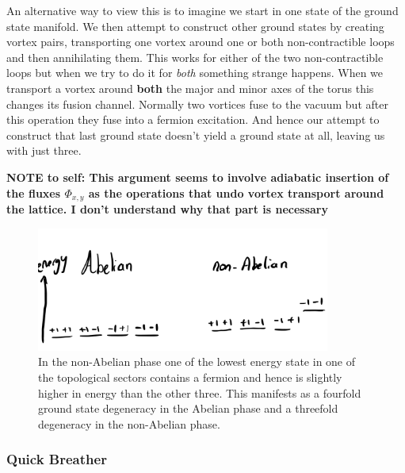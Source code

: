 An alternative way to view this is to imagine we start in one state of the ground state manifold. We then attempt to construct other ground states by creating vortex pairs, transporting one vortex around one or both non-contractible loops and then annihilating them. This works for either of the two non-contractible loops but when we try to do it for \emph{both} something strange happens. When we transport a vortex around \textbf{both} the major and minor axes of the torus this changes its fusion channel. Normally two vortices fuse to the vacuum but after this operation they fuse into a fermion excitation. And hence our attempt to construct that last ground state doesn't yield a ground state at all, leaving us with just three.

\textbf{NOTE to self: This argument seems to involve adiabatic insertion of the fluxes \(\Phi_{x,y}\) as the operations that undo vortex transport around the lattice. I don't understand why that part is necessary}

\begin{figure}
\hypertarget{fig:threefold_degeneracy}{%
\centering
\includegraphics[width=0.86\textwidth,height=\textheight]{figure_code/amk_chapter/threefold_degeneracy.png}
\caption[Ground State Degeneracy in the Abelian and Non-Abelian Phases]{In the non-Abelian phase one of the lowest energy state in one
of the topological sectors contains a fermion and hence is slightly
higher in energy than the other three. This manifests as a fourfold
ground state degeneracy in the Abelian phase and a threefold degeneracy
in the non-Abelian phase.}\label{fig:threefold_degeneracy}
}
\end{figure}

\hypertarget{quick-breather}{%
\subsubsection{Quick Breather}\label{quick-breather}}

